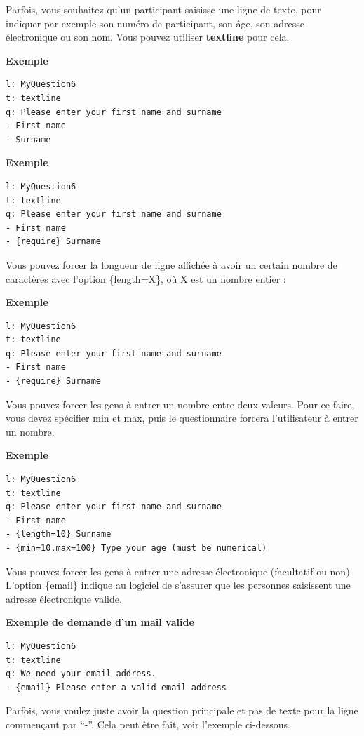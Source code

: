 \documentclass[
]{book}
\begin{document}
Parfois, vous souhaitez qu'un participant saisisse une ligne de texte,
pour indiquer par exemple son numéro de participant, son âge, son
adresse électronique ou son nom. Vous pouvez utiliser \textbf{textline}
pour cela.

\textbf{Exemple}

\begin{verbatim}
l: MyQuestion6
t: textline
q: Please enter your first name and surname
- First name
- Surname
\end{verbatim}

\textbf{Exemple}

\begin{verbatim}
l: MyQuestion6
t: textline
q: Please enter your first name and surname
- First name
- {require} Surname
\end{verbatim}

Vous pouvez forcer la longueur de ligne affichée à avoir un certain
nombre de caractères avec l'option \{length=X\}, où X est un nombre
entier :

\textbf{Exemple}

\begin{verbatim}
l: MyQuestion6
t: textline
q: Please enter your first name and surname
- First name
- {require} Surname
\end{verbatim}

Vous pouvez forcer les gens à entrer un nombre entre deux valeurs. Pour
ce faire, vous devez spécifier min et max, puis le questionnaire forcera
l'utilisateur à entrer un nombre.

\textbf{Exemple}

\begin{verbatim}
l: MyQuestion6
t: textline
q: Please enter your first name and surname
- First name
- {length=10} Surname
- {min=10,max=100} Type your age (must be numerical)
\end{verbatim}

Vous pouvez forcer les gens à entrer une adresse électronique
(facultatif ou non). L'option \{email\} indique au logiciel de s'assurer
que les personnes saisissent une adresse électronique valide.

\textbf{Exemple de demande d'un mail valide}

\begin{verbatim}
l: MyQuestion6
t: textline
q: We need your email address.
- {email} Please enter a valid email address
\end{verbatim}

Parfois, vous voulez juste avoir la question principale et pas de texte
pour la ligne commençant par ``-''. Cela peut être fait, voir l'exemple
ci-dessous.
\end{document}
